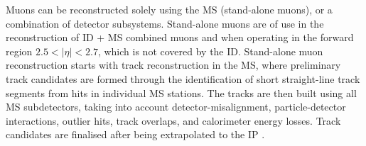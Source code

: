 Muons can be reconstructed solely using the MS (stand-alone muons), or a combination of detector subsystems. Stand-alone muons are of use in the reconstruction of ID + MS combined muons and when operating in the forward region $2.5 < |\eta| < 2.7$, which is not covered by the ID. Stand-alone muon reconstruction starts with track reconstruction in the MS, where preliminary track candidates are formed through the identification of short straight-line track segments from hits in individual MS stations. The tracks are then built using all MS subdetectors, taking into account detector-misalignment, particle-detector interactions, outlier hits, track overlaps, and calorimeter energy losses. Track candidates are finalised after being extrapolated to the IP \cite{Atlas:muonreco}.%

